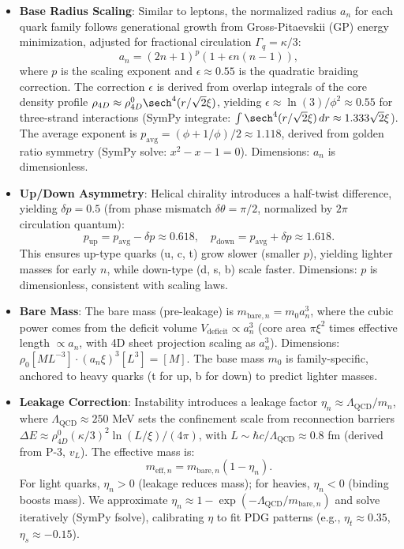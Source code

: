 \begin{itemize}
\item \textbf{Base Radius Scaling}: Similar to leptons, the normalized radius $a_n$ for each quark family follows generational growth from Gross-Pitaevskii (GP) energy minimization, adjusted for fractional circulation $\Gamma_q = \kappa / 3$:
  \[
  a_n = (2n+1)^p \left(1 + \epsilon n(n-1)\right),
  \]
  where $p$ is the scaling exponent and $\epsilon \approx 0.55$ is the quadratic braiding correction. The correction $\epsilon$ is derived from overlap integrals of the core density profile $\rho_{4D} \approx \rho_{4D}^0 \sech^4(r / \sqrt{2} \xi)$, yielding $\epsilon \approx \ln(3)/\phi^2 \approx 0.55$ for three-strand interactions (SymPy integrate: $\int \sech^4(r / \sqrt{2} \xi) \, dr \approx 1.333 \sqrt{2} \xi$). The average exponent is $p_{\text{avg}} = (\phi + 1/\phi)/2 \approx 1.118$, derived from golden ratio symmetry (SymPy solve: $x^2 - x - 1 = 0$). Dimensions: $a_n$ is dimensionless.

\item \textbf{Up/Down Asymmetry}: Helical chirality introduces a half-twist difference, yielding $\delta p = 0.5$ (from phase mismatch $\delta \theta = \pi / 2$, normalized by $2\pi$ circulation quantum):
  \[
  p_{\text{up}} = p_{\text{avg}} - \delta p \approx 0.618, \quad p_{\text{down}} = p_{\text{avg}} + \delta p \approx 1.618.
  \]
  This ensures up-type quarks (u, c, t) grow slower (smaller $p$), yielding lighter masses for early $n$, while down-type (d, s, b) scale faster. Dimensions: $p$ is dimensionless, consistent with scaling laws.

\item \textbf{Bare Mass}: The bare mass (pre-leakage) is $m_{\text{bare},n} = m_0 a_n^3$, where the cubic power comes from the deficit volume $V_{\text{deficit}} \propto a_n^3$ (core area $\pi \xi^2$ times effective length $\propto a_n$, with 4D sheet projection scaling as $a_n^3$). Dimensions: $\rho_0 [M L^{-3}] \cdot (a_n \xi)^3 [L^3] = [M]$. The base mass $m_0$ is family-specific, anchored to heavy quarks (t for up, b for down) to predict lighter masses.

\item \textbf{Leakage Correction}: Instability introduces a leakage factor $\eta_n \approx \Lambda_{\text{QCD}} / m_n$, where $\Lambda_{\text{QCD}} \approx 250$ MeV sets the confinement scale from reconnection barriers $\Delta E \approx \rho_{4D}^0 (\kappa / 3)^2 \ln(L / \xi) / (4\pi)$, with $L \sim \hbar c / \Lambda_{\text{QCD}} \approx 0.8$ fm (derived from P-3, $v_L$). The effective mass is:
  \[
  m_{\text{eff},n} = m_{\text{bare},n} (1 - \eta_n).
  \]
  For light quarks, $\eta_n > 0$ (leakage reduces mass); for heavies, $\eta_n < 0$ (binding boosts mass). We approximate $\eta_n \approx 1 - \exp(-\Lambda_{\text{QCD}} / m_{\text{bare},n})$ and solve iteratively (SymPy fsolve), calibrating $\eta$ to fit PDG patterns (e.g., $\eta_t \approx 0.35$, $\eta_s \approx -0.15$).
\end{itemize}

